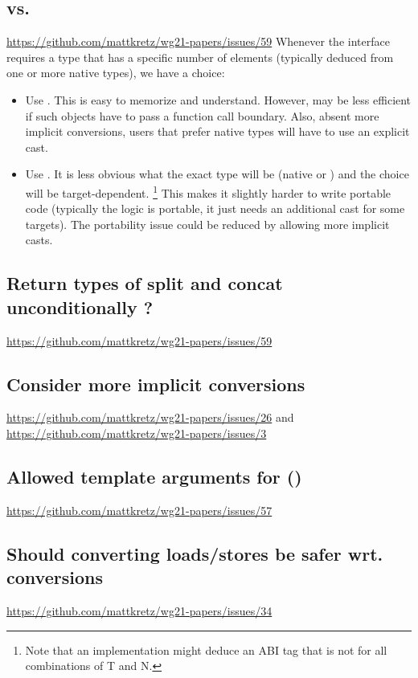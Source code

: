 \subsection{ vs. }
\url{https://github.com/mattkretz/wg21-papers/issues/59}
Whenever the interface requires a \simd type that has a specific number of elements (typically deduced from one or more native types), we have a choice:
\begin{itemize}
  \item Use \fixedsizeN.
    This is easy to memorize and understand.
    However, \fixedsizeN may be less efficient if such objects have to pass a function call boundary.
    Also, absent more implicit conversions, users that prefer native types will have to use an explicit cast.
  \item Use .
    It is less obvious what the exact type will be (native or \fixedsizeN) and the choice will be target-dependent.%
    \footnote{Note that an implementation might deduce an ABI tag that is not \fixedsizeN for all combinations of \type T and \code N.}
    This makes it slightly harder to write portable code (typically the logic is portable, it just needs an additional cast for some targets).
    The portability issue could be reduced by allowing more implicit casts.
\end{itemize}

\subsection{Return types of split and concat unconditionally \fixedsizeN?}
\url{https://github.com/mattkretz/wg21-papers/issues/59}

\subsection{Consider more implicit conversions}
\url{https://github.com/mattkretz/wg21-papers/issues/26} and \url{https://github.com/mattkretz/wg21-papers/issues/3}

\subsection{Allowed template arguments for ()}
\url{https://github.com/mattkretz/wg21-papers/issues/57}

\subsection{Should converting loads/stores be safer wrt. conversions}
\url{https://github.com/mattkretz/wg21-papers/issues/34}

